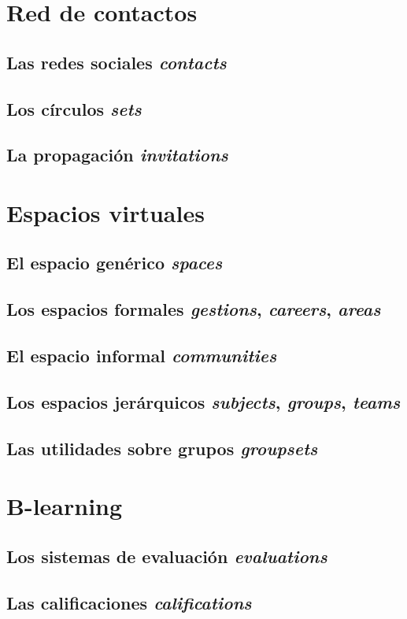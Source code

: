 \section{Red de contactos}
\subsection{Las redes sociales \emph{contacts}}
\subsection{Los círculos \emph{sets}}
\subsection{La propagación \emph{invitations}}

\section{Espacios virtuales}
\subsection{El espacio genérico \emph{spaces}}
\subsection{Los espacios formales \emph{gestions}, \emph{careers},
\emph{areas}}
\subsection{El espacio informal \emph{communities}}
\subsection{Los espacios jerárquicos \emph{subjects}, \emph{groups},
\emph{teams}}
\subsection{Las utilidades sobre grupos \emph{groupsets}}

\section{B-learning}
\subsection{Los sistemas de evaluación \emph{evaluations}}
\subsection{Las calificaciones \emph{califications}}

